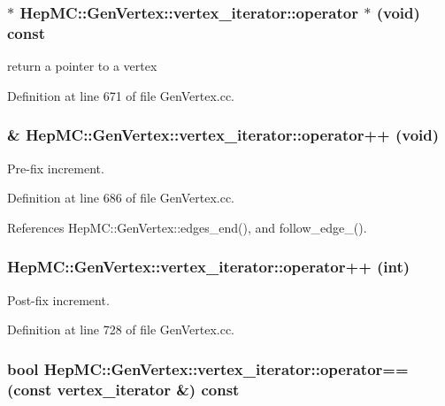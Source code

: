 \subsubsection{ $\ast$ Hep\-MC::Gen\-Vertex::vertex\_\-iterator::operator $\ast$ (void) const}\label{classHepMC_1_1GenVertex_1_1vertex__iterator_4302ed59a3b3d5e94716e3ea09884f81}


return a pointer to a vertex 



Definition at line 671 of file Gen\-Vertex.cc.
\subsubsection{ \& Hep\-MC::Gen\-Vertex::vertex\_\-iterator::operator++ (void)}\label{classHepMC_1_1GenVertex_1_1vertex__iterator_b3ad44c7d24ed89fe1ec56c9a1a7781f}


Pre-fix increment. 



Definition at line 686 of file Gen\-Vertex.cc.

References Hep\-MC::Gen\-Vertex::edges\_\-end(), and follow\_\-edge\_\-().
\subsubsection{ Hep\-MC::Gen\-Vertex::vertex\_\-iterator::operator++ (int)}\label{classHepMC_1_1GenVertex_1_1vertex__iterator_39aa6136df496f224d76095e80d33a9a}


Post-fix increment. 



Definition at line 728 of file Gen\-Vertex.cc.
\subsubsection{\setlength{\rightskip}{0pt plus 5cm}bool Hep\-MC::Gen\-Vertex::vertex\_\-iterator::operator== (const {\bf vertex\_\-iterator} \&) const\hspace{0.3cm}{\tt  [inline]}}\label{classHepMC_1_1GenVertex_1_1vertex__iterator_574ba57eca8eeddb2ff64343817a00c6}


